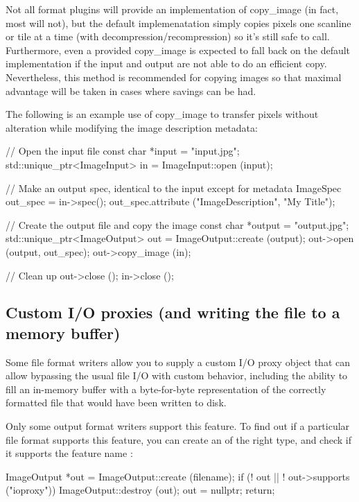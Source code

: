 Not all format plugins will provide an implementation of {\cf
  copy_image} (in fact, most will not), but the default implemenatation
simply copies pixels one scanline or tile at a time (with
decompression/recompression) so it's still safe to call.  Furthermore,
even a provided {\cf copy_image} is expected to fall back on the default
implementation if the input and output are not able to do an efficient
copy.  Nevertheless, this method is recommended
for copying images so that maximal advantage will be taken in cases
where savings can be had.

The following is an example use of {\cf copy_image} to transfer pixels
without alteration while modifying the image description metadata:

\begin{code}
    // Open the input file
    const char *input = "input.jpg";
    std::unique_ptr<ImageInput> in = ImageInput::open (input);

    // Make an output spec, identical to the input except for metadata
    ImageSpec out_spec = in->spec();
    out_spec.attribute ("ImageDescription", "My Title");

    // Create the output file and copy the image
    const char *output = "output.jpg";
    std::unique_ptr<ImageOutput> out = ImageOutput::create (output);
    out->open (output, out_spec);
    out->copy_image (in);

    // Clean up
    out->close ();
    in->close ();
\end{code}


\subsection{Custom I/O proxies (and writing the file to a memory buffer)}
\label{sec:imageoutput:ioproxy}
\NEW   %

Some file format writers allow you to supply a custom I/O proxy object that
can allow bypassing the usual file I/O with custom behavior, including the
ability to fill an in-memory buffer with a byte-for-byte representation of
the correctly formatted file that would have been written to disk.

Only some output format writers support this feature. To find out if a
particular file format supports this feature, you can create an \ImageOutput
of the right type, and check if it supports the feature name :

\begin{code}
    ImageOutput *out = ImageOutput::create (filename);
    if (! out  ||  ! out->supports ("ioproxy")) {
        ImageOutput::destroy (out);
        out = nullptr;
        return;
    }
\end{code}

